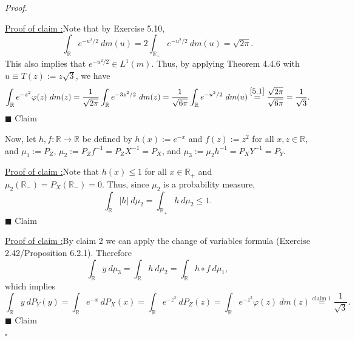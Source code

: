 \documentclass[12pt]{article}
\newcounter{ProofCounter}
\newcounter{ClaimCounter}[ProofCounter]
\newenvironment{Proof}{\stepcounter{ProofCounter}\textit{Proof.}}{\hfill$\square$}
\newenvironment{claim}[1]{\vspace{3mm}\stepcounter{ClaimCounter}\par\noindent\underline{\bf Claim \theClaimCounter:}\space#1}{}
\newenvironment{claimproof}[1]{\par\noindent\underline{Proof of claim \theClaimCounter:}\space#1}{\hfill $\blacksquare$ Claim \theClaimCounter}
\begin{document}
\begin{enumerate}[label=(\alph*)]
\begin{Proof}
\vspace{-5mm}
\begin{claimproof}
Note that by Exercise 5.10, 
\begin{equation}
\int_{\mathbb{R}}e^{-u^{2}/2}\ dm(u) = 2\int_{\mathbb{R}_{+}}e^{-u^{2}/2}\ dm(u) = \sqrt{2\pi}. 
\label{5.1}
\end{equation}
This also implies that $e^{-u^{2}/2} \in L^{1}(m)$. Thus, by applying Theorem 4.4.6 with $u \equiv T(z) := z\sqrt{3}$, we have 
\[ \int_{\mathbb{R}}e^{-z^{2}}\varphi(z)\ dm(z) = \frac{1}{\sqrt{2\pi}}\int_{\mathbb{R}}e^{-3z^{2}/2}\ dm(z) =
\frac{1}{\sqrt{6\pi}}\int_{\mathbb{R}}e^{-u^{2}/2}\ dm(u) \stackrel{\eqref{5.1}}{=} \frac{\sqrt{2\pi}}{\sqrt{6\pi}} = \frac{1}{\sqrt{3}}. \]
\end{claimproof}

Now, let $h,f : \mathbb{R} \rightarrow \mathbb{R}$ be defined by $h(x) := e^{-x}$ and $f(z) := z^{2}$ for all $x,z \in \mathbb{R}$, and $\mu_{1} :=
P_{Z}$, $\mu_{2} := P_{Z}f^{-1} = P_{Z}X^{-1} = P_{X}$, and $\mu_{3} := \mu_{2} h^{-1} = P_{X}Y^{-1} = P_{Y}$.

\begin{claimproof}
Note that $h(x) \leq 1$ for all $x \in \mathbb{R}_{+}$ and $\mu_{2}\left( \mathbb{R}_{-} \right) = P_{X}(\mathbb{R}_{-}) = 0$. Thus, since $\mu_{2}$
is a probability measure, 
\[ \int_{\mathbb{R}}|h|\ d\mu_{2} = \int_{\mathbb{R}_{+}}h\ d\mu_{2} \leq 1. \]
\end{claimproof}

\begin{claimproof}
By claim 2 we can apply the change of variables formula (Exercise 2.42/Proposition 6.2.1). Therefore
\[ \int_{\mathbb{R}}y\ d\mu_{3} = \int_{\mathbb{R}}h\ d\mu_{2} = \int_{\mathbb{R}}h\circ f\ d\mu_{1}, \]
which implies
\[ \int_{\mathbb{R}}y\ dP_{Y}(y) = \int_{\mathbb{R}}e^{-x}\ dP_{X}(x) = \int_{\mathbb{R}}e^{-z^{2}}\ dP_{Z}(z) = \int_{\mathbb{R}}e^{-z^{2}}\varphi(z)\ dm(z) 
\stackrel{\text{claim 1}}{=} \frac{1}{\sqrt{3}}. \]
\end{claimproof}


\end{Proof}
\end{enumerate}
\end{document}
